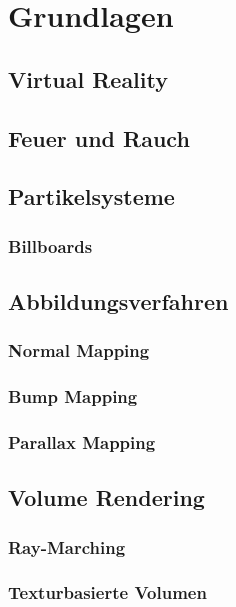 \section{Grundlagen}
\subsection{Virtual Reality}
\subsection{Feuer und Rauch}
\subsection{Partikelsysteme}
\subsubsection{Billboards}
\subsection{Abbildungsverfahren}
\subsubsection{Normal Mapping}
\subsubsection{Bump Mapping}
\subsubsection{Parallax Mapping}
\subsection{Volume Rendering}
\subsubsection{Ray-Marching}
\subsubsection{Texturbasierte Volumen}


\newpage
